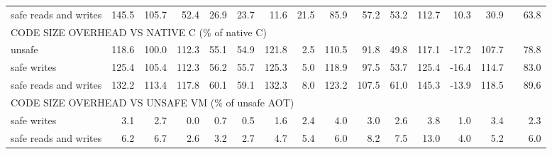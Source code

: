\begin{landscape}
\begin{table}[t!]
\begin{tabular}{lrrrrrrrrrrrrrrr}
    safe reads and writes               &      145.5 &      105.7 &       52.4 &       26.9 &       23.7 &       11.6 &       21.5 &       85.9 &       57.2 &       53.2 &      112.7 &       10.3 &       30.9 &                   &      63.8 \\
    \multicolumn{10}{l}{CODE SIZE OVERHEAD VS NATIVE C (\% of native C)} \\
    unsafe                              &      118.6 &      100.0 &      112.3 &       55.1 &       54.9 &      121.8 &        2.5 &      110.5 &       91.8 &       49.8 &      117.1 &      -17.2 &      107.7 &                   &      78.8 \\
    safe writes                         &      125.4 &      105.4 &      112.3 &       56.2 &       55.7 &      125.3 &        5.0 &      118.9 &       97.5 &       53.7 &      125.4 &      -16.4 &      114.7 &                   &      83.0 \\
    safe reads and writes               &      132.2 &      113.4 &      117.8 &       60.1 &       59.1 &      132.3 &        8.0 &      123.2 &      107.5 &       61.0 &      145.3 &      -13.9 &      118.5 &                   &      89.6 \\
    \multicolumn{10}{l}{CODE SIZE OVERHEAD VS UNSAFE VM (\% of unsafe AOT)} \\
    safe writes                         &        3.1 &        2.7 &        0.0 &        0.7 &        0.5 &        1.6 &        2.4 &        4.0 &        3.0 &        2.6 &        3.8 &        1.0 &        3.4 &                   &       2.3 \\
    safe reads and writes               &        6.2 &        6.7 &        2.6 &        3.2 &        2.7 &        4.7 &        5.4 &        6.0 &        8.2 &        7.5 &       13.0 &        4.0 &        5.2 &                   &       6.0 \\
    \bottomrule
    \end{tabular}
\end{table}
\end{landscape}
\clearpage
\restoregeometry
